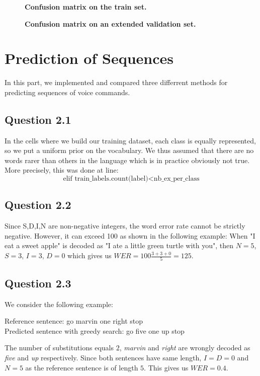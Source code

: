 \documentclass[9pt,twocolumn,letterpaper]{article}
\begin{document}
\begin{figure*}
\begin{center}
\end{center}
   \caption{{\bfseries Confusion matrix on the train set.} }
\label{fig:short}
\end{figure*}
\newpage


\begin{figure*}
\begin{center}
\end{center}
   \caption{{\bfseries Confusion matrix on an extended validation set.} }
\label{fig:short}
\end{figure*}
\newpage


\section{Prediction of Sequences}
In this part, we implemented and compared three differrent methods for predicting sequences of voice commands.
\subsection{Question 2.1}
In the cells where we build our training dataset, each class is equally represented, so we put a uniform prior on the vocabulary. We thus assumed that there are no words rarer than others in the language which is in practice obviously not true. More precisely, this was done at line:\\
$$\text{elif train\_labels.count(label)} < \text{nb\_ex\_per\_class}$$

\subsection{Question 2.2}
Since S,D,I,N are non-negative integers, the word error rate cannot be strictly negative. However, it can exceed 100 as shown in the following example: When "I eat a sweet apple" is decoded as "I ate a little green turtle with you", then $N = 5$, $S = 3$, $I = 3$, $D = 0$ which gives us $WER = 100\frac{3 + 3 + 0}{5} = 125$.

\subsection{Question 2.3}
We consider the following example:
\begin{center}
Reference sentence: go marvin one right stop\\
[2mm]
Predicted sentence with greedy search: go five one up stop
\end{center}
The number of substitutions equals $2$, \textit{marvin} and \textit{right} are wrongly decoded as \textit{five} and \textit{up} respectively. Since both sentences have same length, $I = D = 0$ and $N = 5$ as the reference sentence is of length $5$. This gives us $WER = 0.4$.
\end{document}

